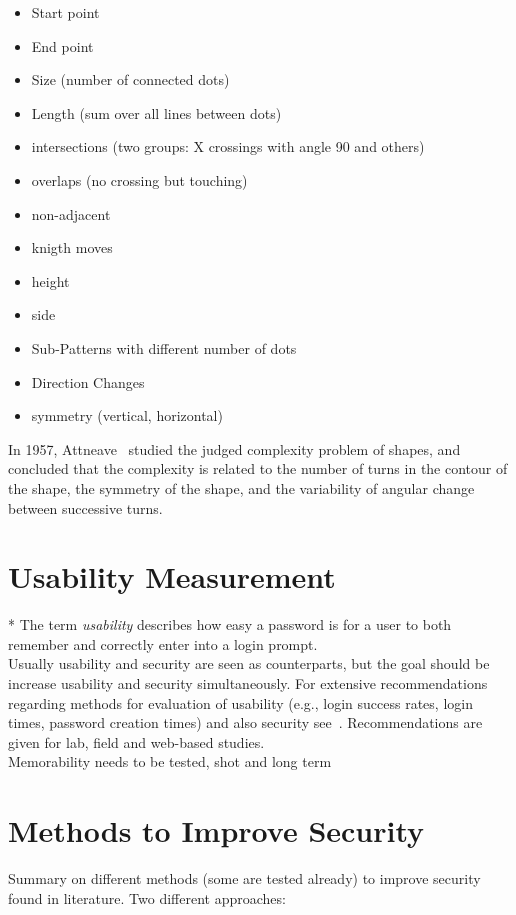 \documentclass[twocolumn, a4paper, 10pt]{article}
\begin{document}
\begin{itemize}
	\item Start point
	\item End point
	\item Size (number of connected dots)
	\item Length (sum over all lines between dots)
	\item intersections (two groups: X crossings with angle 90 and others)
	\item overlaps (no crossing but touching)
	\item non-adjacent
	\item knigth moves
	\item height
	\item side
	\item Sub-Patterns with different number of dots
	\item Direction Changes
	\item symmetry (vertical, horizontal)
\end{itemize}

In 1957, Attneave~\cite{attneave1957physical} studied the judged complexity problem of shapes, and concluded that the complexity is related to the number of turns in the contour of the shape, the symmetry of the shape, and the variability of angular change between successive turns.

\section{Usability Measurement}
\label{sec:usability}
* The term \emph{usability} describes how easy a password is for a user to both remember and correctly enter into a login prompt.\cite{Keith200717}\\
Usually usability and security are seen as counterparts, but the goal should be increase usability and security simultaneously. For extensive recommendations regarding methods for evaluation of usability (e.g., login success rates, login times, password creation times) and also security see~\cite{Biddle:2012:GPL:2333112.2333114}. Recommendations are given for lab, field and web-based studies.\\
Memorability needs to be tested, shot and long term

\section {Methods to Improve Security}
\label{sec:improve}
Summary on different methods (some are tested already) to improve security found in literature. Two different approaches:
\end{document}

